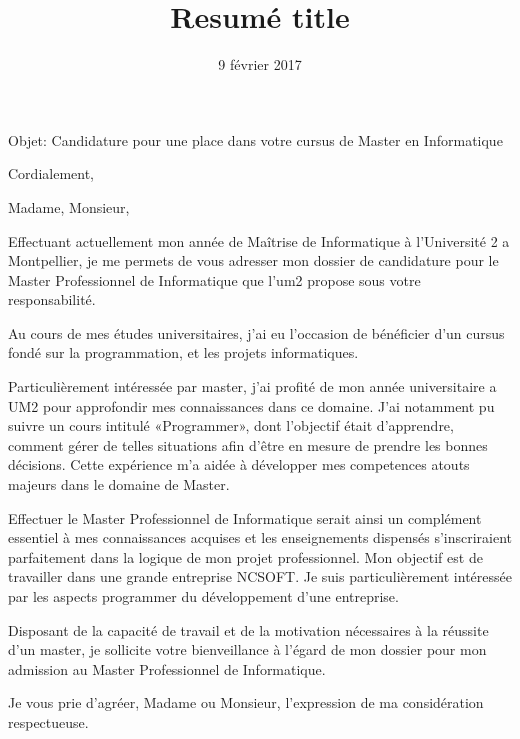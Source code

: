 \documentclass[11pt,a4paper,sans]{moderncv}
\title{Resumé title}
\begin{document}
\date{9 février 2017}
\opening{Objet: Candidature pour une place dans votre cursus de Master en Informatique}
\closing{Cordialement,}
\makelettertitle
Madame, Monsieur,

Effectuant actuellement mon année de Maîtrise de Informatique à l’Université 2 a Montpellier, je me permets de vous adresser mon dossier de candidature pour le Master  Professionnel de Informatique que l’um2 propose sous votre responsabilité.

Au cours de mes études universitaires, j’ai eu l’occasion de bénéficier d’un cursus fondé sur la programmation, et les projets informatiques.

Particulièrement intéressée par master, j’ai profité de mon année universitaire a UM2 pour approfondir mes connaissances dans ce domaine. J’ai notamment pu suivre un cours intitulé «Programmer», dont l’objectif était d’apprendre, comment gérer de telles situations afin d’être en mesure de prendre les bonnes décisions. Cette expérience m’a aidée à développer mes competences atouts majeurs dans le domaine de Master.

Effectuer le Master  Professionnel de Informatique serait ainsi un complément essentiel à mes connaissances acquises et les enseignements dispensés s’inscriraient parfaitement dans la logique de mon projet professionnel. Mon objectif est de travailler dans une grande entreprise NCSOFT. Je suis particulièrement intéressée par les aspects programmer du développement d’une entreprise.

Disposant de la capacité de travail et de la motivation nécessaires à la réussite d’un master, je sollicite votre bienveillance à l’égard de mon dossier pour mon admission au Master Professionnel de Informatique.

Je vous prie d’agréer, Madame ou Monsieur, l’expression de ma considération respectueuse.

\makeletterclosing
\end{document}

